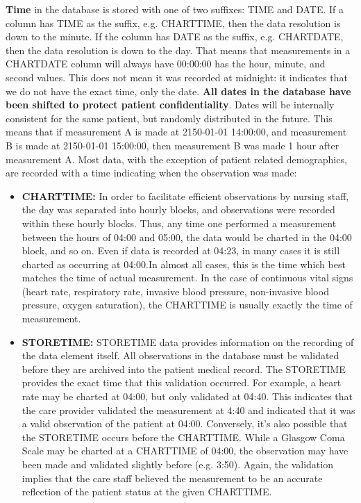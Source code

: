 \textbf{Time} in the database is stored with one of two suffixes: TIME and DATE. If a column has TIME as the suffix, e.g. CHARTTIME, then the data resolution is down to the minute. If the column has DATE as the suffix, e.g. CHARTDATE, then the data resolution is down to the day. That means that measurements in a CHARTDATE column will always have 00:00:00 has the hour, minute, and second values. This does not mean it was recorded at midnight: it indicates that we do not have the exact time, only the date.
\textbf{All dates in the database have been shifted to protect patient confidentiality}. Dates will be internally consistent for the same patient, but randomly distributed in the future. This means that if measurement A is made at 2150-01-01 14:00:00, and measurement B is made at 2150-01-01 15:00:00, then measurement B was made 1 hour after measurement A.
Most data, with the exception of patient related demographics, are recorded with a time indicating when the observation was made:
\begin{itemize}
\item \textbf{CHARTTIME:} In order to facilitate efficient observations by nursing staff, the day was separated into hourly blocks, and observations were recorded within these hourly blocks. Thus, any time one performed a measurement between the hours of 04:00 and 05:00, the data would be charted in the 04:00 block, and so on. Even if data is recorded at 04:23, in many cases it is still charted as occurring at 04:00.In almost all cases, this is the time which best matches the time of actual measurement. In the case of continuous vital signs (heart rate, respiratory rate, invasive blood pressure, non-invasive blood pressure, oxygen saturation), the CHARTTIME is usually exactly the time of measurement. 

\item \textbf{STORETIME:} STORETIME data provides information on the recording of the data element itself. All observations in the database must be validated before they are archived into the patient medical record. The STORETIME provides the exact time that this validation occurred. For example, a heart rate may be charted at 04:00, but only validated at 04:40. This indicates that the care provider validated the measurement at 4:40 and indicated that it was a valid observation of the patient at 04:00. Conversely, it’s also possible that the STORETIME occurs before the CHARTTIME. While a Glasgow Coma Scale may be charted at a CHARTTIME of 04:00, the observation may have been made and validated slightly before (e.g. 3:50). Again, the validation implies that the care staff believed the measurement to be an accurate reflection of the patient status at the given CHARTTIME.
\end{itemize}

